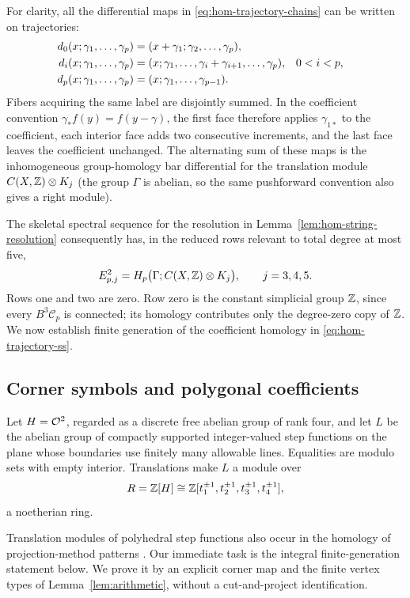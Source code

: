 For clarity, all the differential maps in
\eqref{eq:hom-trajectory-chains} can be written on trajectories:
\begin{align}
 d_0(x;\gamma_1,\ldots,\gamma_p)
   &=(x+\gamma_1;\gamma_2,\ldots,\gamma_p),\notag\\
 d_i(x;\gamma_1,\ldots,\gamma_p)
   &=(x;\gamma_1,\ldots,\gamma_i+\gamma_{i+1},\ldots,\gamma_p),
       &&0<i<p,\label{eq:hom-trajectory-faces}\\
 d_p(x;\gamma_1,\ldots,\gamma_p)
   &=(x;\gamma_1,\ldots,\gamma_{p-1}).\notag
\end{align}
Fibers acquiring the same label are disjointly summed.  In the
coefficient convention $\gamma_*f(y)=f(y-\gamma)$, the first face
therefore applies $\gamma_{1*}$ to the coefficient, each interior
face adds two consecutive increments, and the last face leaves
the coefficient unchanged.  The alternating sum of these maps is
the inhomogeneous group-homology bar differential for the
translation module $C(X,\mathbb Z)\otimes K_j$ (the group $\Gamma$ is
abelian, so the same pushforward convention also gives a right
module).

The skeletal spectral sequence for the resolution in
Lemma~\ref{lem:hom-string-resolution} consequently has, in the
reduced rows relevant to total degree at most five,
\begin{equation}\label{eq:hom-trajectory-ss}
 E^2_{p,j}
   =H_p\bigl(\Gamma;C(X,\mathbb Z)\otimes K_j\bigr),
       \qquad j=3,4,5.
\end{equation}
Rows one and two are zero.  Row zero is the constant simplicial
group $\mathbb Z$, since every $B^3\mathcal C_p$ is connected; its
homology contributes only the degree-zero copy of $\mathbb Z$.
We now establish finite generation of the coefficient homology
in \eqref{eq:hom-trajectory-ss}.

\subsection{Corner symbols and polygonal coefficients}

Let $H=\mathcal O^2$, regarded as a discrete free abelian group of rank
four, and let $L$ be the abelian group of compactly supported
integer-valued step functions on the plane whose boundaries use
finitely many allowable lines.  Equalities are modulo sets with
empty interior.  Translations make $L$ a module over
\[
 R=\mathbb Z[H]\cong
       \mathbb Z[t_1^{\pm1},t_2^{\pm1},t_3^{\pm1},t_4^{\pm1}],
\]
a noetherian ring.

Translation modules of polyhedral step functions also occur in the
homology of projection-method patterns
\cite[Section~3.1]{GahlerHuntonKellendonk2013}.  Our immediate task is
the integral finite-generation statement below.  We prove it by an
explicit corner map and the finite vertex types of
Lemma~\ref{lem:arithmetic}, without a cut-and-project identification.

